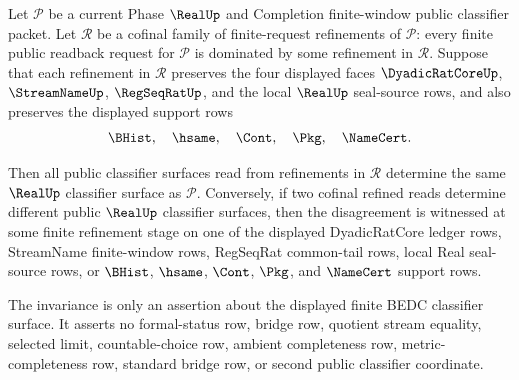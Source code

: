\begin{theorem}
\label{thm:real-l10-cofinal-classifier-refinement-invariance}
Let $\mathcal P$ be a current Phase $\RealUp$ and Completion finite-window public classifier packet. Let $\mathcal R$ be a cofinal family of finite-request refinements of $\mathcal P$: every finite public readback request for $\mathcal P$ is dominated by some refinement in $\mathcal R$. Suppose that each refinement in $\mathcal R$ preserves the four displayed faces $\DyadicRatCoreUp$, $\StreamNameUp$, $\RegSeqRatUp$, and the local $\RealUp$ seal-source rows, and also preserves the displayed support rows
$$
\BHist,\quad \hsame,\quad \Cont,\quad \Pkg,\quad \NameCert.
$$

Then all public classifier surfaces read from refinements in $\mathcal R$ determine the same $\RealUp$ classifier surface as $\mathcal P$. Conversely, if two cofinal refined reads determine different public $\RealUp$ classifier surfaces, then the disagreement is witnessed at some finite refinement stage on one of the displayed DyadicRatCore ledger rows, StreamName finite-window rows, RegSeqRat common-tail rows, local Real seal-source rows, or $\BHist$, $\hsame$, $\Cont$, $\Pkg$, and $\NameCert$ support rows.

The invariance is only an assertion about the displayed finite BEDC classifier surface. It asserts no formal-status row, bridge row, quotient stream equality, selected limit, countable-choice row, ambient completeness row, metric-completeness row, standard bridge row, or second public classifier coordinate.
\end{theorem}
